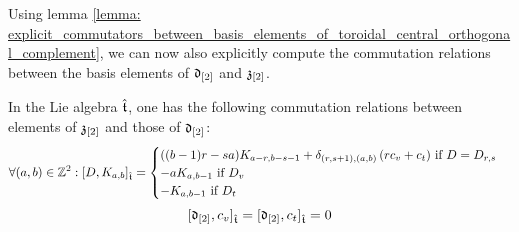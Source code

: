         Using lemma \ref{lemma: explicit_commutators_between_basis_elements_of_toroidal_central_orthogonal_complement}, we can now also explicitly compute the commutation relations between the basis elements of $\mathfrak{d}_{[2]}$ and $\mathfrak{z}_{[2]}$.
        \begin{lemma} \label{lemma: explicit_commutators_between_central_basis_elements_and_derivations}
            In the Lie algebra $\hat{\mathfrak{t}}$, one has the following commutation relations between elements of $\mathfrak{z}_{[2]}$ and those of $\mathfrak{d}_{[2]}$:
                $$
                    \forall (a, b) \in \mathbb{Z}^2: [D, K_{a, b}]_{\hat{\mathfrak{t}}} =
                    \begin{cases}
                        \text{$((b - 1)r - sa) K_{a - r, b - s - 1} + \delta_{(r, s + 1), (a, b)} \left( r c_v + c_t \right)$ if $D = D_{r, s}$}
                        \\
                        \text{$-a K_{a, b - 1}$ if $D_v$}
                        \\
                        \text{$-K_{a, b - 1}$ if $D_t$}
                    \end{cases}
                $$
                $$[\mathfrak{d}_{[2]}, c_v]_{\hat{\mathfrak{t}}} = [\mathfrak{d}_{[2]}, c_t]_{\hat{\mathfrak{t}}} = 0$$
        \end{lemma}
